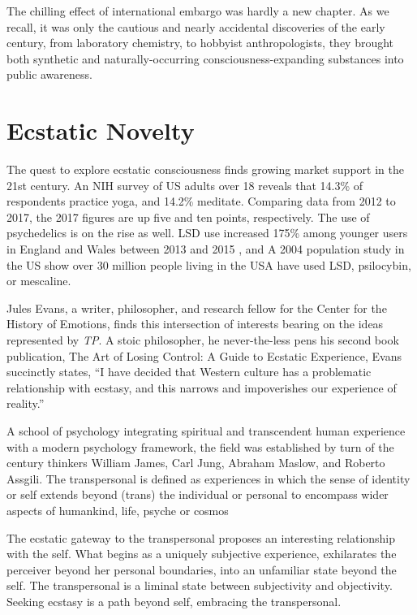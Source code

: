 \documentclass{UIdahoMastersThesis}
\begin{document}
The chilling effect of international embargo was hardly a new chapter. As we recall, it was only the cautious and nearly accidental discoveries of the early  century, from laboratory chemistry, to hobbyist anthropologists, they brought both synthetic and naturally-occurring consciousness-expanding substances into public awareness. 

\section{Ecstatic Novelty}

The quest to explore ecstatic consciousness finds growing market support in the 21st century. An NIH survey of US adults over 18 reveals that 14.3\% of respondents practice yoga, and 14.2\% meditate.  Comparing data from 2012 to 2017, the 2017 figures are up five and ten points, respectively. The use of psychedelics is on the rise as well. LSD use increased 175\% among younger users in England and Wales between 2013 and 2015 \cite{gayle_ecstasy_2015}, and A 2004 population study in the US show over 30 million people living in the USA have used LSD, psilocybin, or mescaline. \cite{krebs_psychedelics_2013}

Jules Evans, a writer, philosopher, and research fellow for the Center for the History of Emotions, finds this intersection of interests bearing on the ideas represented by \textit{\ac{TP}}. A stoic philosopher, he never-the-less pens his second book publication, The Art of Losing Control: A Guide to Ecstatic Experience, Evans succinctly states, \enquote{I have decided that Western culture has a problematic relationship with ecstasy, and this narrows and impoverishes our experience of reality.}

A school of psychology integrating spiritual and transcendent human experience with a modern psychology framework, the field was established by turn of the century thinkers William James, Carl Jung, Abraham Maslow, and Roberto Assgili. The transpersonal is defined as experiences in which the sense of identity or self extends beyond (trans) the individual or personal to encompass wider aspects of humankind, life, psyche or cosmos \cite{calijornia1993transpersonal}

The ecstatic gateway to the transpersonal proposes an interesting relationship with the self. What begins as a uniquely subjective experience, exhilarates the perceiver beyond her personal boundaries, into an unfamiliar state beyond the self. The transpersonal is a liminal state between subjectivity and objectivity. Seeking ecstasy is a path beyond self, embracing the transpersonal.
\end{document}
